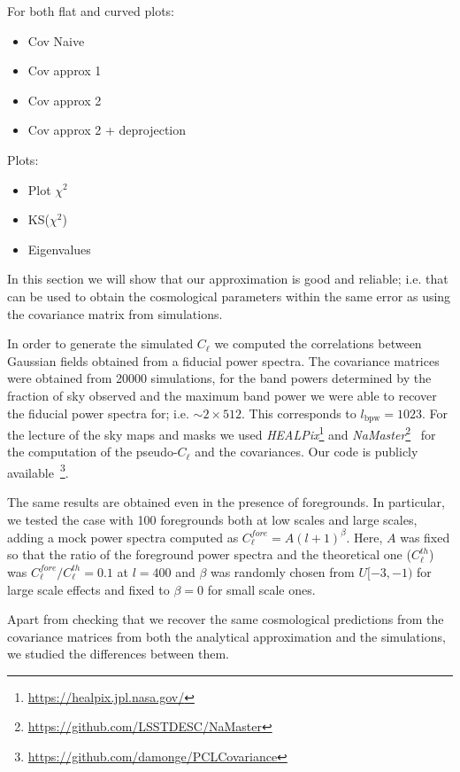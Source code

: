 \documentclass[useAMS,usenatbib]{mn2e}
\newcommand{\clth}{C_\ell^{th}}
\newcommand{\clf}{C_\ell^{fore}}
\newcommand{\cl}{C_\ell}
\begin{document}
For both flat and curved plots:
\begin{itemize}
\item Cov Naive
\item Cov approx 1
\item Cov approx 2
\item Cov approx 2 + deprojection
\end{itemize}

Plots:
\begin{itemize}
\item Plot $\chi^2$
\item KS($\chi^2$)
\item Eigenvalues
\end{itemize}

In this section we will show that our approximation is good and reliable; i.e.
that can be used to obtain the cosmological parameters within the same error
as using the covariance matrix from simulations. 

In order to generate the simulated $\cl$ we computed the correlations between
Gaussian fields obtained from a fiducial power spectra. The covariance
matrices were obtained from 20000 simulations, for the band powers determined
by the fraction of sky observed and the maximum band power we were able to
recover the fiducial power spectra for; i.e. $\sim 2 \times 512$. This
corresponds to $l_{\mbox{bpw}} = 1023$. For the lecture of the sky maps and
masks we used \textit{HEALPix}\footnote{\url{https://healpix.jpl.nasa.gov/}}
and
\textit{NaMaster}\footnote{\url{https://github.com/LSSTDESC/NaMaster}}~\cite{2018arXiv180909603A}
for the computation of the pseudo-$\cl$ and the covariances. Our code is
publicly available~\footnote{\url{https://github.com/damonge/PCLCovariance}}.

The same results are obtained even in the presence of foregrounds. In
particular, we tested the case with 100 foregrounds both at low scales and
large scales, adding a mock power spectra computed as $\clf = A (l +
1)^{\beta}$. Here, $A$ was fixed so that the ratio of the foreground power
spectra and the theoretical one ($\clth$) was $\clf/\clth = 0.1$ at $l=400$
and $\beta$ was randomly chosen from $U[-3, -1)$ for large scale effects and
fixed to $\beta = 0$ for small scale ones.

Apart from checking that we recover the same cosmological predictions from the
covariance matrices from both the analytical approximation and the
simulations, we studied the differences between them.
\end{document}
